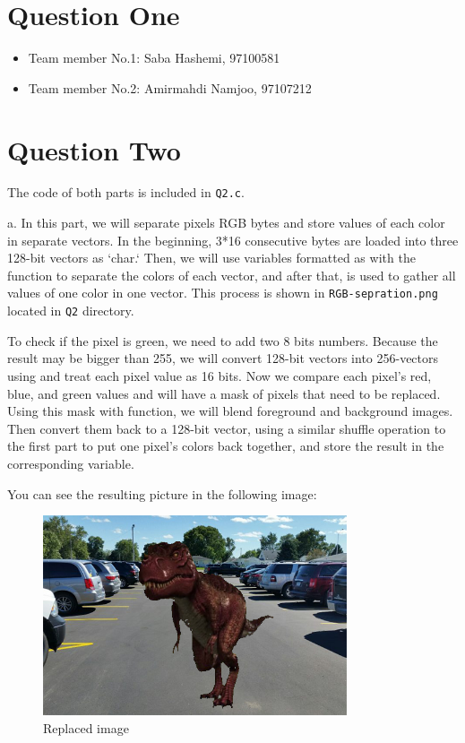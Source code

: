 \documentclass[12pt]{article}
\begin{document}
\section{Question One}

\begin{itemize}
	
	\item Team member No.1: Saba Hashemi, 97100581
	\item Team member No.2: Amirmahdi Namjoo, 97107212
\end{itemize}

\newpage

\section{Question Two}

The code of both parts is included in \Verb+Q2.c+.

a. In this part, we will separate pixels RGB bytes and store values of each color in separate vectors. In the beginning, 3*16 consecutive bytes are loaded into three 128-bit vectors as `char.` Then, we will use variables formatted as  with the  function to separate the colors of each vector, and after that,  is used to gather all values of one color in one vector. This process is shown in \Verb+RGB-sepration.png+ located in \Verb+Q2+ directory.

To check if the pixel is green, we need to add two 8 bits numbers. Because the result may be bigger than 255, we will convert 128-bit vectors into 256-vectors using  and treat each pixel value as 16 bits. Now we compare each pixel's red, blue, and green values and will have a mask of pixels that need to be replaced. Using this mask with  function, we will blend foreground and background images. Then convert them back to a 128-bit vector, using a similar shuffle operation to the first part to put one pixel's colors back together, and store the result in the corresponding variable.

You can see the resulting picture in the following image:


\begin{figure}[H]
	\centering
	\includegraphics[width=0.8\textwidth]{./images/Q2/replaced.bmp}	
	\cprotect\caption{Replaced image}
	\label{fig:2-1}
\end{figure}
\end{document}
